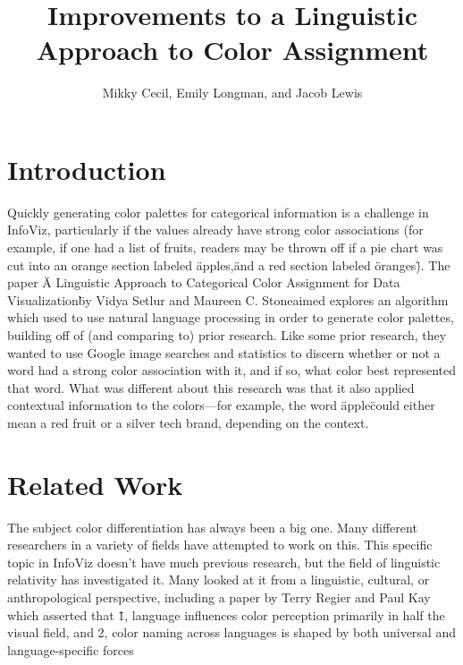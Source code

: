\documentclass[journal]{vgtc}                %
\title{Improvements to a Linguistic Approach to Color Assignment}
\author{Mikky Cecil, Emily Longman, and Jacob Lewis}
\begin{document}


\maketitle

\section{Introduction} %
Quickly generating color palettes for categorical information is a challenge in InfoViz, particularly if the values already have strong color associations (for example, if one had a list of fruits, readers may be thrown off if a pie chart was cut into an orange section labeled \"apples,\" and a red section labeled \"oranges\"). 
The paper \"A Linguistic Approach to Categorical Color Assignment
for Data Visualization\" by Vidya Setlur and Maureen C. Stoneaimed \cite{basis}
explores an algorithm which used to use natural language processing in order to generate color palettes, building off of (and comparing to) prior research. 
Like some prior research, they wanted to use Google image searches and statistics to discern whether or not a word had a strong color association with it, and if so, what color best represented that word. What was different about this research was that it also applied contextual information to the colors---for example, the word \"apple\" could either mean a red fruit or a silver tech brand, depending on the context.

\section{Related Work}
The subject color differentiation has always been a big one.
Many different researchers in a variety of fields have attempted to work on this.
This specific topic in InfoViz doesn't have much previous research, but the field of linguistic relativity has investigated it.
Many looked at it from a linguistic, cultural, or anthropological perspective, including a paper by Terry Regier and Paul Kay which asserted that \"1, language influences color perception primarily in half
the visual field, and 2, color naming across languages is
shaped by both universal and language-specific forces\" \cite{Whorf}
\end{document}

